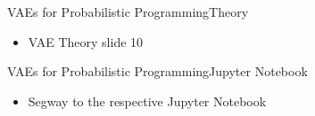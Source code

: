 \documentclass[AERbeamer%
              ,optEnglish%
              ,optBiber%
              ,optBibstyleAlphabetic%
              ,optBeamerClassicFormat%
              ]{AERlatex}%
\begin{document}
\begin{frame}[c]{VAEs for Probabilistic Programming}{Theory}
    \centering
    \begin{itemize}
        \item VAE Theory slide 10
    \end{itemize}
\end{frame}


\begin{frame}[c]{VAEs for Probabilistic Programming}{Jupyter Notebook}
    \centering
    \begin{itemize}
        \item Segway to the respective Jupyter Notebook
    \end{itemize}
\end{frame}



%
%
%
%
\end{document}
